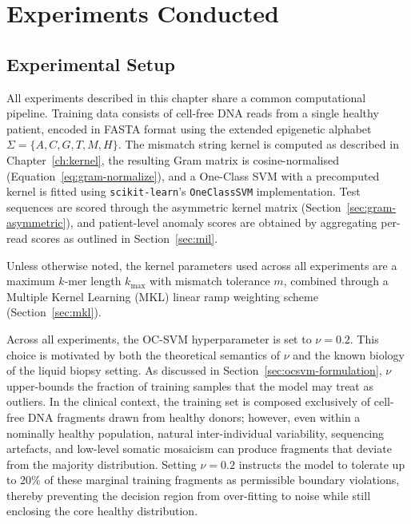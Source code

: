 \chapter{Experiments Conducted}\label{ch:experiments}

\section{Experimental Setup}\label{sec:experimental-setup}

All experiments described in this chapter share a common computational pipeline.
Training data consists of cell-free DNA reads from a single healthy patient, encoded in FASTA format using the extended epigenetic alphabet $\Sigma = \{A, C, G, T, M, H\}$.
The mismatch string kernel is computed as described in Chapter~\ref{ch:kernel}, the resulting Gram matrix is cosine-normalised (Equation~\ref{eq:gram-normalize}), and a One-Class SVM with a precomputed kernel is fitted using \texttt{scikit-learn}'s \texttt{OneClassSVM} implementation.
Test sequences are scored through the asymmetric kernel matrix (Section~\ref{sec:gram-asymmetric}), and patient-level anomaly scores are obtained by aggregating per-read scores as outlined in Section~\ref{sec:mil}.

Unless otherwise noted, the kernel parameters used across all experiments are a maximum $k$-mer length $k_{\max}$ with mismatch tolerance $m$, combined through a Multiple Kernel Learning (MKL) linear ramp weighting scheme (Section~\ref{sec:mkl}).

Across all experiments, the OC-SVM hyperparameter is set to $\nu = 0.2$. This choice is motivated by both the theoretical semantics of $\nu$ and the known biology of the liquid biopsy setting. As discussed in Section~\ref{sec:ocsvm-formulation}, $\nu$ upper-bounds the fraction of training samples that the model may treat as outliers. In the clinical context, the training set is composed exclusively of cell-free DNA fragments drawn from healthy donors; however, even within a nominally healthy population, natural inter-individual variability, sequencing artefacts, and low-level somatic mosaicism can produce fragments that deviate from the majority distribution. Setting $\nu = 0.2$ instructs the model to tolerate up to $20\%$ of these marginal training fragments as permissible boundary violations, thereby preventing the decision region from over-fitting to noise while still enclosing the core healthy distribution.

